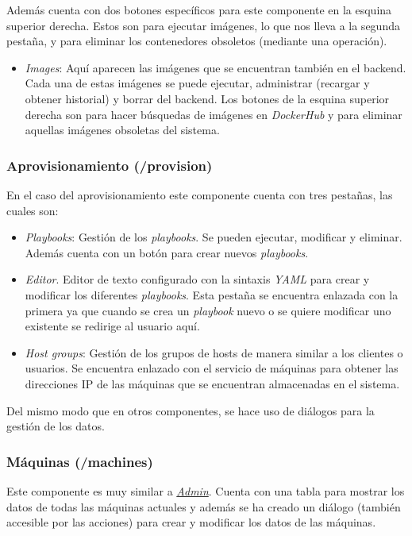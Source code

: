 \bigskip
Además cuenta con dos botones específicos para este componente en la esquina superior derecha. Estos son para ejecutar imágenes, lo que nos lleva a la segunda pestaña, y para eliminar los contenedores obsoletos (mediante una operación).
\begin{itemize}
	\item \textit{Images}: Aquí aparecen las imágenes que se encuentran también en el backend. Cada una de estas imágenes se puede ejecutar, administrar (recargar y obtener historial) y borrar del backend. Los botones de la esquina superior derecha son para hacer búsquedas de imágenes en \textit{DockerHub} y para eliminar aquellas imágenes obsoletas del sistema.
\end{itemize}




\subsubsection{Aprovisionamiento (/provision)}


En el caso del aprovisionamiento este componente cuenta con tres pestañas, las cuales son:
\begin{itemize}
	\item \textit{Playbooks}: Gestión de los \textit{playbooks}. Se pueden ejecutar, modificar y eliminar. Además cuenta con un botón para crear nuevos \textit{playbooks}.
	\item \textit{Editor}. Editor de texto configurado con la sintaxis \textit{YAML} para crear y modificar los diferentes \textit{playbooks}. Esta pestaña se encuentra enlazada con la primera ya que cuando se crea un \textit{playbook} nuevo o se quiere modificar uno existente se redirige al usuario aquí.
	\item \textit{Host groups}: Gestión de los grupos de hosts de manera similar a los clientes o usuarios. Se encuentra enlazado con el servicio de máquinas para obtener las direcciones IP de las máquinas que se encuentran almacenadas en el sistema.
\end{itemize}

Del mismo modo que en otros componentes, se hace uso de diálogos para la gestión de los datos.


\subsubsection{Máquinas (/machines)}

Este componente es muy similar a \hyperref[sec:admin]{\textit{Admin}}. Cuenta con una tabla para mostrar los datos de todas las máquinas actuales y además se ha creado un diálogo (también accesible por las acciones) para crear y modificar los datos de las máquinas.


